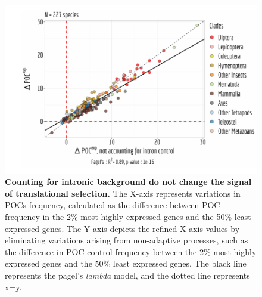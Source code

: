 \begin{figure}[t]   
    \begin{center}                                                                       
        \includegraphics[width=\textwidth]{Figure5_supp.pdf}
    \end{center}                                                                       
    \caption[Counting for intronic background do not change the signal of translational selection]{\textbf{Counting for intronic background do not change the signal of translational selection.} The X-axis represents variations in POCs frequency, calculated as the difference between POC frequency in the 2\% most highly expressed genes and the 50\% least expressed genes. The Y-axis depicts the refined X-axis values by eliminating variations arising from non-adaptive processes, such as the difference in POC-control frequency between the 2\% most highly expressed genes and the 50\% least expressed genes. The black line represents the pagel's \textit{lambda} model, and the dotted line represents x=y.} 
    \label{suppfig:CU5}
\end{figure}


